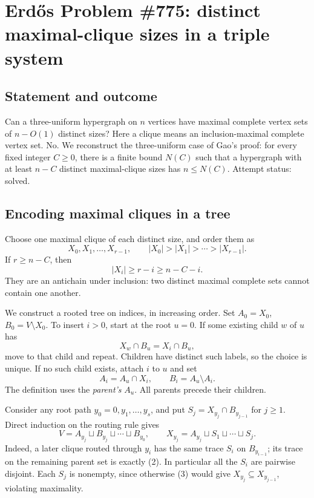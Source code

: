 \section*{Erd\H{o}s Problem \#775: distinct maximal-clique sizes in a triple system}
\subsection*{Statement and outcome}
Can a three-uniform hypergraph on \(n\) vertices have maximal complete vertex sets of \(n-O(1)\) distinct sizes? Here a clique means an inclusion-maximal complete vertex set.
No. We reconstruct the three-uniform case of Gao's proof: for every fixed integer \(C\geq0\), there is a finite bound \(N(C)\) such that a hypergraph with at least \(n-C\) distinct maximal-clique sizes has \(n\leq N(C)\). Attempt status: solved.

\subsection*{Encoding maximal cliques in a tree}
Choose one maximal clique of each distinct size, and order them as
\[
X_0,X_1,\ldots,X_{r-1},\qquad |X_0|>|X_1|>\cdots>|X_{r-1}|.
\]
If \(r\geq n-C\), then
\[
|X_i|\geq r-i\geq n-C-i. \tag{1}
\]
They are an antichain under inclusion: two distinct maximal complete sets cannot contain one another.

We construct a rooted tree on indices, in increasing order. Set
\(A_0=X_0\), \(B_0=V\setminus X_0\).
To insert \(i>0\), start at the root \(u=0\). If some existing child \(w\) of \(u\) has
\[
X_w\cap B_u=X_i\cap B_u,
\]
move to that child and repeat. Children have distinct such labels, so the choice is unique. If no such child exists, attach \(i\) to \(u\) and set
\[
A_i=A_u\cap X_i,\qquad B_i=A_u\setminus A_i. \tag{2}
\]
The definition uses the \emph{parent's} \(A_u\). All parents precede their children.

Consider any root path \(y_0=0,y_1,\ldots,y_s\), and put
\(S_j=X_{y_j}\cap B_{y_{j-1}}\) for \(j\geq1\). Direct induction on the routing rule gives
\[
V=A_{y_j}\sqcup B_{y_j}\sqcup\cdots\sqcup B_{y_0},\qquad
X_{y_j}=A_{y_j}\sqcup S_1\sqcup\cdots\sqcup S_j. \tag{3}
\]
Indeed, a later clique routed through \(y_i\) has the same trace \(S_i\) on \(B_{y_{i-1}}\); its trace on the remaining parent set is exactly (2). In particular all the \(S_i\) are pairwise disjoint. Each \(S_j\) is nonempty, since otherwise (3) would give \(X_{y_j}\subseteq X_{y_{j-1}}\), violating maximality.

